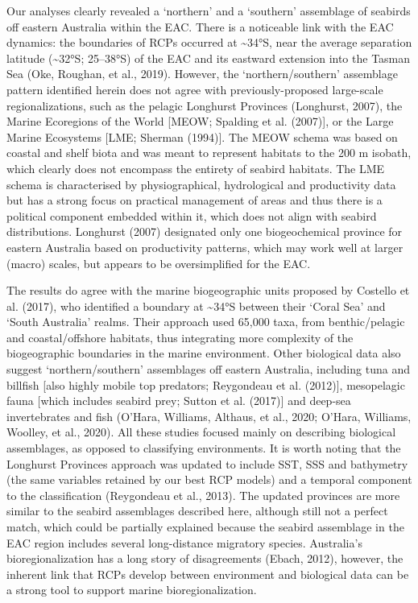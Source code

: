 \documentclass{article}
\begin{document}
\begin{linenumbers}
Our analyses clearly revealed a `northern' and a `southern' assemblage of seabirds off eastern Australia within the EAC. There is a noticeable link with the EAC dynamics: the boundaries of RCPs occurred at \textasciitilde34°S, near the average separation latitude (\textasciitilde32°S; 25--38°S) of the EAC and its eastward extension into the Tasman Sea (Oke, Roughan, et al., 2019). However, the `northern/southern' assemblage pattern identified herein does not agree with previously-proposed large-scale regionalizations, such as the pelagic Longhurst Provinces (Longhurst, 2007), the Marine Ecoregions of the World {[}MEOW; Spalding et al. (2007){]}, or the Large Marine Ecosystems {[}LME; Sherman (1994){]}. The MEOW schema was based on coastal and shelf biota and was meant to represent habitats to the 200 m isobath, which clearly does not encompass the entirety of seabird habitats. The LME schema is characterised by physiographical, hydrological and productivity data but has a strong focus on practical management of areas and thus there is a political component embedded within it, which does not align with seabird distributions. Longhurst (2007) designated only one biogeochemical province for eastern Australia based on productivity patterns, which may work well at larger (macro) scales, but appears to be oversimplified for the EAC.

The results do agree with the marine biogeographic units proposed by Costello et al. (2017), who identified a boundary at \textasciitilde34°S between their `Coral Sea' and `South Australia' realms. Their approach used 65,000 taxa, from benthic/pelagic and coastal/offshore habitats, thus integrating more complexity of the biogeographic boundaries in the marine environment. Other biological data also suggest `northern/southern' assemblages off eastern Australia, including tuna and billfish {[}also highly mobile top predators; Reygondeau et al. (2012){]}, mesopelagic fauna {[}which includes seabird prey; Sutton et al. (2017){]} and deep-sea invertebrates and fish (O'Hara, Williams, Althaus, et al., 2020; O'Hara, Williams, Woolley, et al., 2020). All these studies focused mainly on describing biological assemblages, as opposed to classifying environments. It is worth noting that the Longhurst Provinces approach was updated to include SST, SSS and bathymetry (the same variables retained by our best RCP models) and a temporal component to the classification (Reygondeau et al., 2013). The updated provinces are more similar to the seabird assemblages described here, although still not a perfect match, which could be partially explained because the seabird assemblage in the EAC region includes several long-distance migratory species. Australia's bioregionalization has a long story of disagreements (Ebach, 2012), however, the inherent link that RCPs develop between environment and biological data can be a strong tool to support marine bioregionalization.


\end{linenumbers}
\end{document}
